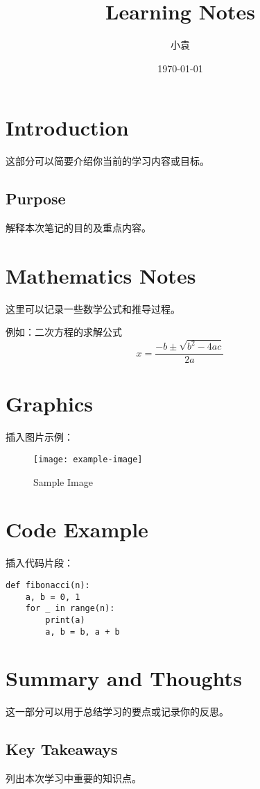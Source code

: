 \documentclass[a4paper,12pt]{ctexart}
\title{Learning Notes}
\author{小袁}
\date{\today}
\begin{document}
\maketitle

\tableofcontents   %
\newpage

\section{Introduction}
这部分可以简要介绍你当前的学习内容或目标。

\subsection{Purpose}
解释本次笔记的目的及重点内容。

\section{Mathematics Notes}
这里可以记录一些数学公式和推导过程。

例如：二次方程的求解公式
\begin{equation}
x = \frac{-b \pm \sqrt{b^2 - 4ac}}{2a}
\end{equation}

\section{Graphics}
插入图片示例：
\begin{figure}[h]
\centering
\texttt{[image: example-image]} %
\caption{Sample Image}
\end{figure}

\section{Code Example}
插入代码片段：
\begin{lstlisting}
def fibonacci(n):
    a, b = 0, 1
    for _ in range(n):
        print(a)
        a, b = b, a + b
\end{lstlisting}

\section{Summary and Thoughts}
这一部分可以用于总结学习的要点或记录你的反思。

\subsection{Key Takeaways}
列出本次学习中重要的知识点。
\end{document}

